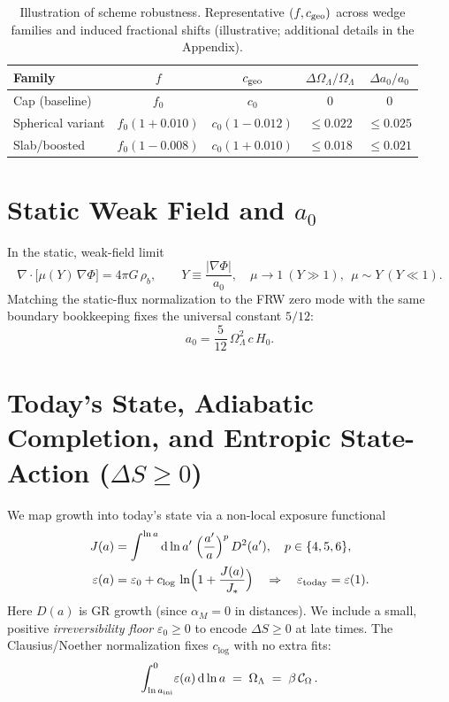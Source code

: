 \documentclass[aps,prd,onecolumn,notitlepage,superscriptaddress,nofootinbib]{revtex4-2}
\newcommand{\COmega}{\mathcal{C}_{\Omega}}
\newcommand{\OL}{\Omega_{\Lambda}}
\newcommand{\alpham}{\alpha_M}
\newcommand{\Hzero}{H_0}
\newcommand{\eps}{\varepsilon}
\newcommand{\dd}{\mathrm{d}}
\begin{document}
\begin{table}[H]
\centering
\caption{Illustration of scheme robustness. Representative \((f,c_{\rm geo})\) across wedge families and induced fractional shifts (illustrative; additional details in the Appendix).}
\begin{tabular}{lcccc}
\toprule
Family & $f$ & $c_{\rm geo}$ & $\Delta\OL/\OL$ & $\Delta a_0/a_0$\\
\midrule
Cap (baseline)    & $f_0$ & $c_0$ & 0 & 0\\
Spherical variant & $f_0(1+0.010)$ & $c_0(1-0.012)$ & $\le 0.022$ & $\le 0.025$\\
Slab/boosted      & $f_0(1-0.008)$ & $c_0(1+0.010)$ & $\le 0.018$ & $\le 0.021$\\
\bottomrule
\end{tabular}
\end{table}

\section{Static Weak Field and \texorpdfstring{$a_0$}{a0}}
In the static, weak-field limit
\begin{equation}
\nabla\cdot\big[\mu(Y)\,\nabla\Phi\big]=4\pi G\,\rho_b,\qquad Y\equiv \frac{|\nabla\Phi|}{a_0},\quad
\mu\to 1\ (Y\gg 1),\ \ \mu\sim Y\ (Y\ll 1).
\end{equation}
Matching the static-flux normalization to the FRW zero mode with the same boundary bookkeeping fixes the universal constant \(5/12\):
\begin{equation}
  a_0=\frac{5}{12}\,\OL^2\,c\,\Hzero.
\end{equation}

\section{Today's State, Adiabatic Completion, and Entropic State-Action \texorpdfstring{(\(\Delta S\ge 0\))}{(ΔS≥0)}}
We map growth into today's state via a non-local exposure functional
\begin{align}
  J(a) &= \int^{\ln a}\dd\ln a'\;\Big(\frac{a'}{a}\Big)^{p}\,D^2(a'),\quad p\in\{4,5,6\},\label{eq:J}\\
  \eps(a) &= \eps_0 + c_{\log}\,\ln\!\Big(1+\frac{J(a)}{J_\ast}\Big) \quad\Rightarrow\quad \eps_{\rm today}=\eps(1).
\end{align}
Here \(D(a)\) is GR growth (since \(\alpham=0\) in distances). We include a small, positive \emph{irreversibility floor} \(\eps_0\ge 0\) to encode \(\Delta S\ge 0\) at late times. The Clausius/Noether normalization fixes \(c_{\log}\) with no extra fits:
\begin{equation}
  \int_{\ln a_{\rm ini}}^{0}\!\eps(a)\,\dd\ln a \;=\; \OL \;=\; \beta\,\COmega\,.
\end{equation}
\end{document}
